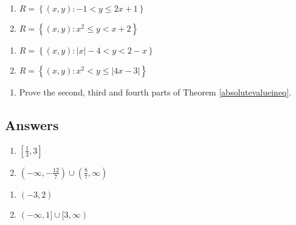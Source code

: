 \begin{multicols}{2} 
\begin{enumerate}
\setcounter{enumi}{\value{HW}}

\item $R = \left\{ (x,y) : -1 < y \leq 2x + 1 \right\}$
\item $R = \left\{ (x,y) : x^2 \leq y < x+2  \right\}$ 

\setcounter{HW}{\value{enumi}}
\end{enumerate}
\end{multicols}

\begin{multicols}{2} 
\begin{enumerate}
\setcounter{enumi}{\value{HW}}

\item $R = \left\{ (x,y) : |x|-4 < y < 2-x  \right\}$
\item $R = \left\{ (x,y) : x^{2} < y \leq |4x - 3| \right\}$ \label{sketchregionineqlast}

\setcounter{HW}{\value{enumi}}
\end{enumerate}
\end{multicols}

\begin{enumerate}
\setcounter{enumi}{\value{HW}}

\item Prove the second, third and fourth parts of Theorem \ref{absolutevalueineq}.

\setcounter{HW}{\value{enumi}}
\end{enumerate}

\newpage

\subsection{Answers}

\begin{multicols}{2}
\begin{enumerate}


\item $\left[\frac{1}{3}, 3\right]$
\item $\left(-\infty, -\frac{12}{7} \right) \cup \left(\frac{8}{7}, \infty\right)$

\setcounter{HW}{\value{enumi}}
\end{enumerate}
\end{multicols}

\begin{multicols}{2}
\begin{enumerate}
\setcounter{enumi}{\value{HW}}

\item $(-3,2)$   
\item $(-\infty,1] \cup [3,\infty)$

\setcounter{HW}{\value{enumi}}
\end{enumerate}
\end{multicols}

